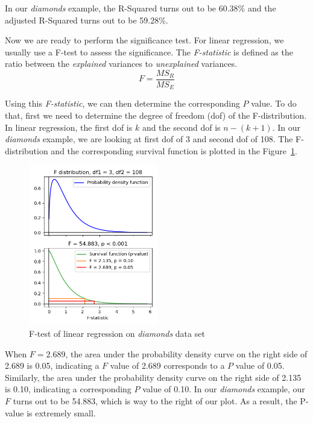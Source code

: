 \documentclass[
	letterpaper
]{article}
\begin{document}
In our \textit{diamonds} example, the R-Squared turns out to be 60.38\% and the adjusted R-Squared turns out to be 59.28\%.

Now we are ready to perform the significance test.
For linear regression, we usually use a F-test to assess the significance.
The \textit{F-statistic} is defined as the ratio between the \textit{explained} variances to \textit{unexplained} variances.
\begin{equation}
F = \frac{MS_R}{MS_E}
\end{equation}

Using this \textit{F-statistic}, we can then determine the corresponding $P$ value.
To do that, first we need to determine the degree of freedom (dof) of the F-distribution.
In linear regression, the first dof is $k$ and the second dof is $n - (k+1)$.
In our \textit{diamonds} example, we are looking at first dof of 3 and second dof of 108.
The F-distribution and the corresponding survival function is plotted in the Figure~\ref{fig:f-test}.
\begin{figure}[htbp]
	\centering
	\includegraphics[width=0.5\textwidth]{figures/f-test.png}
	\caption{F-test of linear regression on \textit{diamonds} data set}
	\label{fig:f-test}
\end{figure}

When $F=2.689$, the area under the probability density curve on the right side of 2.689 is 0.05, indicating a $F$ value of 2.689 corresponds to a $P$ value of 0.05.
Similarly, the area under the probability density curve on the right side of 2.135 is 0.10, indicating a corresponding $P$ value of 0.10.
In our \textit{diamonds} example, our $F$ turns out to be 54.883, which is way to the right of our plot.
As a result, the P-value is extremely small.
\end{document}
